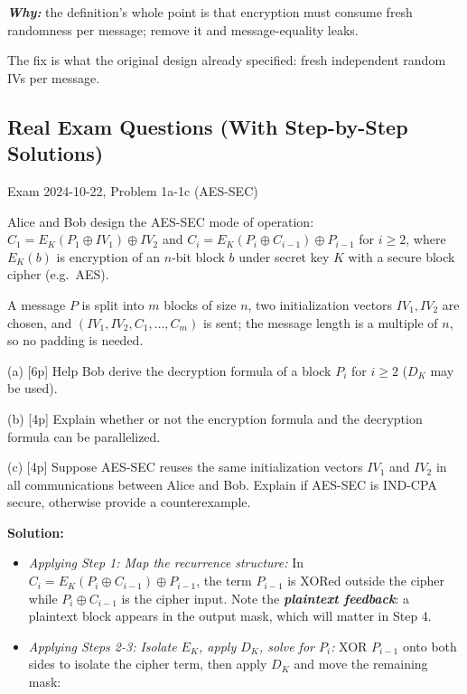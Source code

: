 \documentclass[12pt, a4paper]{article}
\newcommand{\term}[1]{\textbf{\textit{#1}}}        %
\begin{document}
\begin{itemize}
    \term{Why:} the definition's whole point is that encryption must consume fresh randomness per message; remove it and message-equality leaks.

    The fix is what the original design already specified: fresh independent random IVs per message.
\end{itemize}

\subsection*{Real Exam Questions (With Step-by-Step Solutions)}

\begin{practicebox}{Exam 2024-10-22, Problem 1a-1c (AES-SEC)}
\begin{problembox}
Alice and Bob design the AES-SEC mode of operation: $C_1 = E_K(P_1 \oplus IV_1) \oplus IV_2$ and $C_i = E_K(P_i \oplus C_{i-1}) \oplus P_{i-1}$ for $i \geq 2$, where $E_K(b)$ is encryption of an $n$-bit block $b$ under secret key $K$ with a secure block cipher (e.g.\ AES).

A message $P$ is split into $m$ blocks of size $n$, two initialization vectors $IV_1, IV_2$ are chosen, and $(IV_1, IV_2, C_1, \dots, C_m)$ is sent; the message length is a multiple of $n$, so no padding is needed.

(a) [6p] Help Bob derive the decryption formula of a block $P_i$ for $i \geq 2$ ($D_K$ may be used).

(b) [4p] Explain whether or not the encryption formula and the decryption formula can be parallelized.

(c) [4p] Suppose AES-SEC reuses the same initialization vectors $IV_1$ and $IV_2$ in all communications between Alice and Bob. Explain if AES-SEC is IND-CPA secure, otherwise provide a counterexample.
\end{problembox}

\textbf{Solution:}
\begin{itemize}
    \item \textit{Applying Step 1: Map the recurrence structure:} In $C_i = E_K(P_i \oplus C_{i-1}) \oplus P_{i-1}$, the term $P_{i-1}$ is XORed outside the cipher while $P_i \oplus C_{i-1}$ is the cipher input. Note the \term{plaintext feedback}: a plaintext block appears in the output mask, which will matter in Step 4.
    \item \textit{Applying Steps 2-3: Isolate $E_K$, apply $D_K$, solve for $P_i$:} XOR $P_{i-1}$ onto both sides to isolate the cipher term, then apply $D_K$ and move the remaining mask:


\end{itemize}
\end{practicebox}
\end{document}
